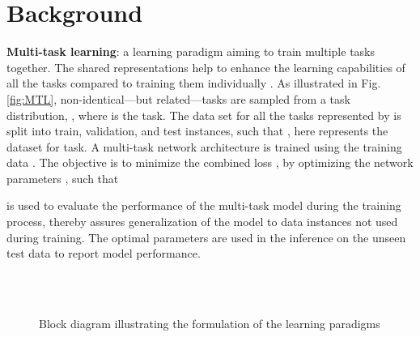 \documentclass[conference]{IEEEtran}
\begin{document}
 
\section{Background} \label{formulation}
\textbf{Multi-task learning}: a learning paradigm aiming to train multiple tasks together.
The shared representations help to enhance the learning capabilities of all the tasks compared to training them individually \cite{maurer2016benefit}.
As illustrated in Fig. \ref{fig:MTL},  non-identical---but related---tasks are sampled from a task distribution, , where  is the  task.
The data set for all the tasks represented by  is split into  train,  validation, and  test instances, such that  , here  represents the dataset for  task.
A multi-task network architecture is trained using the training data .
The objective is to minimize the combined loss , by optimizing the network parameters , such that

 is used to evaluate the performance of the multi-task model during the training process, thereby assures generalization of the model to data instances not used during training.
The optimal parameters  are used in the inference on the unseen test data  to report model performance. 






\begin{figure}[ht]
  \centering
   \\
  \\
  \caption{Block diagram illustrating the formulation of the learning paradigms} \label{fig:block_diag}
 \vspace{-0.7cm}
\end{figure}
\end{document}
